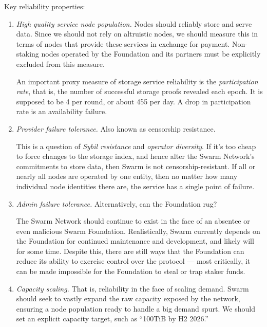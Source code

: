 Key reliability properties:
\begin{enumerate}
  \item \emph{High quality service node population.} 
    Nodes should reliably store and serve data. 
    Since we should not rely on altruistic nodes, we should measure this in terms of nodes that provide these services in exchange for payment.
    Non-staking nodes operated by the Foundation and its partners must be explicitly excluded from this measure.
    
    An important proxy measure of storage service reliability is the \emph{participation rate}, that is, the number of successful storage proofs revealed each epoch. 
    It is supposed to be 4 per round, or about 455 per day.
    A drop in participation rate is an availability failure.

  \item 
    \emph{Provider failure tolerance.} Also known as censorship resistance.
    
    This is a question of \emph{Sybil resistance} and \emph{operator diversity}. 
    If it's too cheap to force changes to the storage index, and hence alter the Swarm Network's commitments to store data, then Swarm is not censorship-resistant.
    If all or nearly all nodes are operated by one entity, then no matter how many individual node identities there are, the service has a single point of failure.
    
  \item 
    \emph{Admin failure tolerance.} 
    Alternatively, can the Foundation rug?
    
    The Swarm Network should continue to exist in the face of an absentee or even malicious Swarm Foundation.
    Realistically, Swarm currently depends on the Foundation for continued maintenance and development, and likely will for some time.
    Despite this, there are still ways that the Foundation can reduce its ability to exercise control over the protocol — most critically, it can be made impossible for the Foundation to steal or trap staker funds.

  \item 
    \emph{Capacity scaling.} That is, reliability in the face of scaling demand. 
    Swarm should seek to vastly expand the raw capacity exposed by the network, ensuring a node population ready to handle a big demand spurt.
    We should set an explicit capacity target, such as ``100TiB by H2 2026.''

\end{enumerate}

